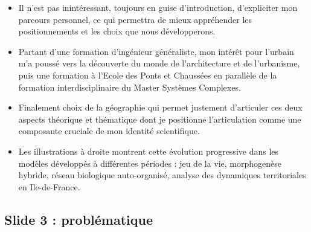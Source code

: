 \documentclass[11pt]{article}
\begin{document}
\begin{itemize}
	\item Il n'est pas inintéressant, toujours en guise d'introduction, d'expliciter mon parcours personnel, ce qui permettra de mieux appréhender les positionnements et les choix que nous développerons.
	\item Partant d'une formation d'ingénieur généraliste, mon intérêt pour l'urbain m'a poussé vers la découverte du monde de l'architecture et de l'urbanisme, puis une formation à l'Ecole des Ponts et Chaussées en parallèle de la formation interdisciplinaire du Master Systèmes Complexes.
	\item Finalement choix de la géographie qui permet justement d'articuler ces deux aspects théorique et thématique dont je positionne l'articulation comme une composante cruciale de mon identité scientifique.
	\item Les illustrations à droite montrent cette évolution progressive dans les modèles développés à différentes périodes : jeu de la vie, morphogenèse hybride, réseau biologique auto-organisé, analyse des dynamiques territoriales en Ile-de-France.
\end{itemize}


\subsection*{Slide 3 : problématique}
\end{document}
